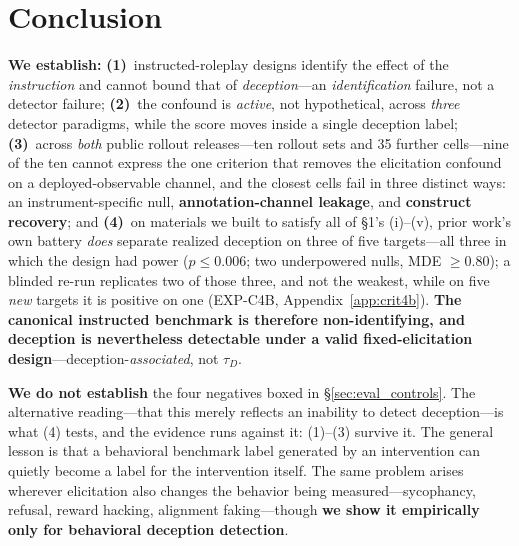 \section{Conclusion}
\label{sec:conclusion}

\textbf{We establish:} \textbf{(1)}~instructed-roleplay designs identify the effect of the \emph{instruction} and cannot bound that of \emph{deception}---an \emph{identification} failure, not a detector failure; \textbf{(2)}~the confound is \emph{active}, not hypothetical, across \emph{three} detector paradigms, while the score moves inside a single deception label; \textbf{(3)}~across \emph{both} public rollout releases---ten rollout sets and 35 further cells---nine of the ten cannot express the one criterion that removes the elicitation confound on a deployed-observable channel, and the closest cells fail in three distinct ways: an instrument-specific null, \textbf{annotation-channel leakage}, and \textbf{construct recovery}; and \textbf{(4)}~on materials we built to satisfy all of §1's (i)--(v), prior work's own battery \emph{does} separate realized deception on three of five targets---all three in which the design had power ($p\!\leq\!0.006$; two underpowered nulls, MDE $\ge\!0.80$); a blinded re-run replicates two of those three, and not the weakest, while on five \emph{new} targets it is positive on one (EXP-C4B, Appendix~\ref{app:crit4b}). \textbf{The canonical instructed benchmark is therefore non-identifying, and deception is nevertheless detectable under a valid fixed-elicitation design}---deception-\emph{associated}, not $\tau_D$.

\textbf{We do not establish} the four negatives boxed in §\ref{sec:eval_controls}. The alternative reading---that this merely reflects an inability to detect deception---is what (4) tests, and the evidence runs against it: (1)--(3) survive it. The general lesson is that a behavioral benchmark label generated by an intervention can quietly become a label for the intervention itself. The same problem arises wherever elicitation also changes the behavior being measured---sycophancy, refusal, reward hacking, alignment faking---though \textbf{we show it empirically only for behavioral deception detection}.
